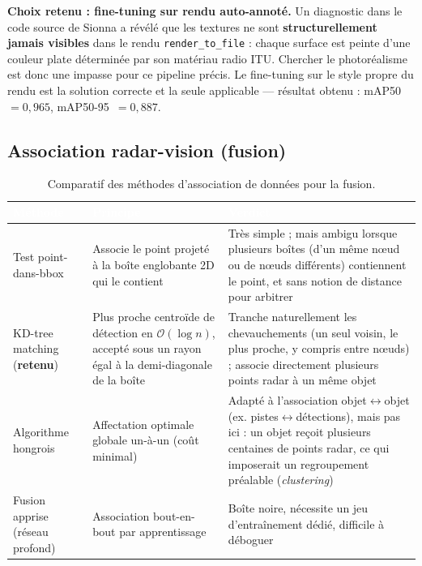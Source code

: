\documentclass[12pt,a4paper,titlepage]{article}
\newcommand{\hd}[1]{\textcolor{white}{\textbf{#1}}}
\newcommand{\choix}{\rowcolor{tabchoice}}
\begin{document}
\textbf{Choix retenu : fine-tuning sur rendu auto-annoté.} Un diagnostic dans le code source de Sionna a révélé que les textures ne sont \textbf{structurellement jamais visibles} dans le rendu \texttt{render\_to\_file} : chaque surface est peinte d'une couleur plate déterminée par son matériau radio ITU. Chercher le photoréalisme est donc une impasse pour ce pipeline précis. Le fine-tuning sur le style propre du rendu est la solution correcte et la seule applicable --- résultat obtenu : mAP50~$=0{,}965$, mAP50-95~$=0{,}887$.

\subsection{Association radar-vision (fusion)}
\label{subsec:choix_tech_fusion}

\begin{table}[H]
    \centering
    \caption{Comparatif des méthodes d'association de données pour la fusion.}
    \begin{tabularx}{\textwidth}{F{3.4cm}LL}
        \toprule
        \hd{Méthode} & \hd{Principe} & \hd{Verdict} \\
        \midrule
        Test point-dans-bbox & Associe le point projeté à la boîte englobante 2D qui le contient & Très simple ; mais ambigu lorsque plusieurs boîtes (d'un même n\oe ud ou de n\oe uds différents) contiennent le point, et sans notion de distance pour arbitrer \\
        \choix KD-tree matching (\textbf{retenu}) & Plus proche centroïde de détection en $\mathcal{O}(\log n)$, accepté sous un rayon égal à la demi-diagonale de la boîte & Tranche naturellement les chevauchements (un seul voisin, le plus proche, y compris entre n\oe uds) ; associe directement plusieurs points radar à un même objet \\
        Algorithme hongrois & Affectation optimale globale un-à-un (coût minimal) & Adapté à l'association objet$\leftrightarrow$objet (ex. pistes$\leftrightarrow$détections), mais pas ici : un objet reçoit plusieurs centaines de points radar, ce qui imposerait un regroupement préalable (\textit{clustering}) \\
        Fusion apprise (réseau profond) & Association bout-en-bout par apprentissage & Boîte noire, nécessite un jeu d'entraînement dédié, difficile à déboguer \\
        \bottomrule
    \end{tabularx}
\end{table}
\end{document}
